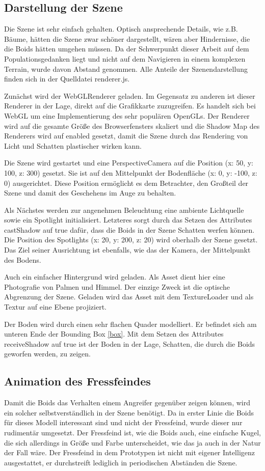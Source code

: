 \documentclass[draft=false
              ,paper=a4
              ,twoside=false
              ,fontsize=11pt
              ,headsepline
              ,BCOR10mm
              ,DIV11
              ,bibtotoc
              ,liststotoc
              ]{scrbook}
\begin{document}
\subsection{Darstellung der Szene}
Die Szene ist sehr einfach gehalten. Optisch ansprechende Details, wie z.B. Bäume, hätten die Szene zwar schöner dargestellt, wären aber Hindernisse, die die Boids hätten umgehen müssen. Da der Schwerpunkt dieser Arbeit auf dem Populationsgedanken liegt und nicht auf dem Navigieren in einem komplexen Terrain, wurde davon Abstand genommen. Alle Anteile der Szenendarstellung finden sich in der Quelldatei renderer.js.

Zunächst wird der WebGLRenderer geladen. Im Gegensatz zu anderen ist dieser Renderer in der Lage, direkt auf die Grafikkarte zuzugreifen. Es handelt sich bei WebGL um eine Implementierung des sehr populären OpenGLs. Der Renderer wird auf die gesamte Größe des Browserfensters skaliert und die Shadow Map des Renderers wird auf enabled gesetzt, damit die Szene durch das Rendering von Licht und Schatten plastischer wirken kann.

Die Szene wird gestartet und eine PerspectiveCamera auf die Position (x: 50, y: 100, z: 300) gesetzt. Sie ist auf den Mittelpunkt der Bodenfläche (x: 0, y: -100, z: 0) ausgerichtet. Diese Position ermöglicht es dem Betrachter, den Großteil der Szene und damit des Geschehens im Auge zu behalten.

Als Nächstes werden zur angenehmen Beleuchtung eine ambiente Lichtquelle sowie ein Spotlight initialisiert. Letzteres sorgt durch das Setzen des Attributes castShadow auf true dafür, dass die Boids in der Szene Schatten werfen können. Die Position des Spotlights (x: 20, y: 200, z: 20) wird oberhalb der Szene gesetzt. Das Ziel seiner Ausrichtung ist ebenfalls, wie das der Kamera, der Mittelpunkt des Bodens.

Auch ein einfacher Hintergrund wird geladen. Als Asset dient hier eine Photografie von Palmen und Himmel. Der einzige Zweck ist die optische Abgrenzung der Szene. Geladen wird das Asset mit dem TextureLoader und als Textur auf eine Ebene projiziert.

Der Boden wird durch einen sehr flachen Quader modelliert. Er befindet sich am unteren Ende der Bounding Box \ref{box}. Mit dem Setzen des Attributes receiveShadow auf true ist der Boden in der Lage, Schatten, die durch die Boids geworfen werden, zu zeigen.

\subsection{Animation des Fressfeindes}
Damit die Boids das Verhalten einem Angreifer gegenüber zeigen können, wird ein solcher selbstverständlich in der Szene benötigt. Da in erster Linie die Boids für dieses Modell interessant sind und nicht der Fressfeind, wurde dieser nur rudimentär umgesetzt. Der Fressfeind ist, wie die Boids auch, eine einfache Kugel, die sich allerdings in Größe und Farbe unterscheidet, wie das ja auch in der Natur der Fall wäre. Der Fressfeind in dem Prototypen ist nicht mit eigener Intelligenz ausgestattet, er durchstreift lediglich in periodischen Abständen die Szene.
\end{document}
